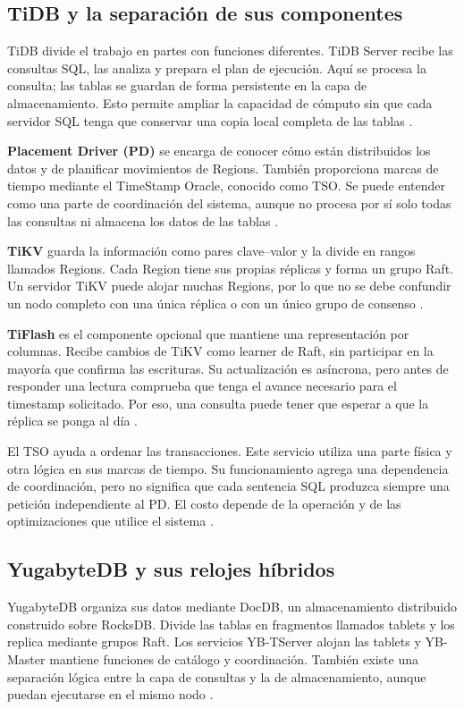 \documentclass[11pt,a4paper]{article}
\begin{document}
\subsection{TiDB y la separación de sus componentes}
TiDB divide el trabajo en partes con funciones diferentes. TiDB Server recibe las consultas SQL, las analiza y prepara el plan de ejecución. Aquí se procesa la consulta; las tablas se guardan de forma persistente en la capa de almacenamiento. Esto permite ampliar la capacidad de cómputo sin que cada servidor SQL tenga que conservar una copia local completa de las tablas \cite{tidb_arch}.

\textbf{Placement Driver (PD)} se encarga de conocer cómo están distribuidos los datos y de planificar movimientos de Regions. También proporciona marcas de tiempo mediante el TimeStamp Oracle, conocido como TSO. Se puede entender como una parte de coordinación del sistema, aunque no procesa por sí solo todas las consultas ni almacena los datos de las tablas \cite{tidb_tso}.

\textbf{TiKV} guarda la información como pares clave--valor y la divide en rangos llamados Regions. Cada Region tiene sus propias réplicas y forma un grupo Raft. Un servidor TiKV puede alojar muchas Regions, por lo que no se debe confundir un nodo completo con una única réplica o con un único grupo de consenso \cite{tidb_tikv}.

\textbf{TiFlash} es el componente opcional que mantiene una representación por columnas. Recibe cambios de TiKV como learner de Raft, sin participar en la mayoría que confirma las escrituras. Su actualización es asíncrona, pero antes de responder una lectura comprueba que tenga el avance necesario para el timestamp solicitado. Por eso, una consulta puede tener que esperar a que la réplica se ponga al día \cite{tidb_tiflash}.

El TSO ayuda a ordenar las transacciones. Este servicio utiliza una parte física y otra lógica en sus marcas de tiempo. Su funcionamiento agrega una dependencia de coordinación, pero no significa que cada sentencia SQL produzca siempre una petición independiente al PD. El costo depende de la operación y de las optimizaciones que utilice el sistema \cite{tidb_tso}.

\subsection{YugabyteDB y sus relojes híbridos}
YugabyteDB organiza sus datos mediante DocDB, un almacenamiento distribuido construido sobre RocksDB. Divide las tablas en fragmentos llamados tablets y los replica mediante grupos Raft. Los servicios YB-TServer alojan las tablets y YB-Master mantiene funciones de catálogo y coordinación. También existe una separación lógica entre la capa de consultas y la de almacenamiento, aunque puedan ejecutarse en el mismo nodo \cite{yb_arch}.
\end{document}
